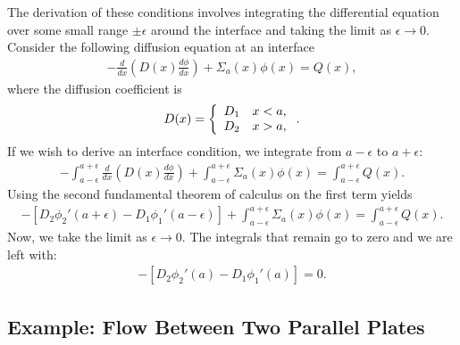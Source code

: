 The derivation of these conditions involves integrating the differential equation over some small range $\pm \epsilon$ around the interface and taking the limit as $\epsilon \rightarrow 0$. Consider the following diffusion equation at an interface
\begin{align}
  -\frac{d}{dx} \left( D(x) \frac{d\phi}{dx} \right) + \Sigma_a(x) \phi(x) = Q(x),
\end{align}
where the diffusion coefficient is
\begin{align}
  D(x) = \left\{ \begin{array}{c l} D_1 & x < a, \\
                                    D_2 & x > a, \\ \end{array} \right. .
\end{align}
If we wish to derive an interface condition, we integrate from $a - \epsilon$ to $a + \epsilon$:
\begin{align}
  - \int_{a-\epsilon}^{a+\epsilon} \frac{d}{dx} \left( D(x) \frac{d\phi}{dx} \right) + \int_{a-\epsilon}^{a+\epsilon} \Sigma_a(x) \phi(x) = \int_{a-\epsilon}^{a+\epsilon} Q(x).
\end{align}
Using the second fundamental theorem of calculus on the first term yields
\begin{align}
  - \left[  D_2 \phi_2'(a + \epsilon) -  D_1 \phi_1'(a - \epsilon) \right] + \int_{a-\epsilon}^{a+\epsilon} \Sigma_a(x) \phi(x) = \int_{a-\epsilon}^{a+\epsilon} Q(x).
\end{align}
Now, we take the limit as $\epsilon \rightarrow 0$. The integrals that remain go to zero and we are left with:
\begin{align}
  - \left[  D_2 \phi_2'(a) -  D_1 \phi_1'(a) \right] = 0.
\end{align}

\subsection{Example: Flow Between Two Parallel Plates}

